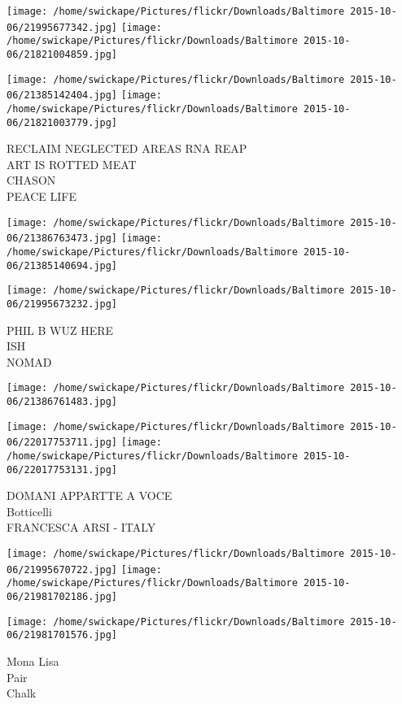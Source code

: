 \documentclass[10pt,letterpaper]{article}
\begin{document}
\texttt{[image: /home/swickape/Pictures/flickr/Downloads/Baltimore 2015-10-06/21995677342.jpg]}
\texttt{[image: /home/swickape/Pictures/flickr/Downloads/Baltimore 2015-10-06/21821004859.jpg]}

\texttt{[image: /home/swickape/Pictures/flickr/Downloads/Baltimore 2015-10-06/21385142404.jpg]}
\texttt{[image: /home/swickape/Pictures/flickr/Downloads/Baltimore 2015-10-06/21821003779.jpg]}

RECLAIM NEGLECTED AREAS RNA REAP\\
ART IS ROTTED MEAT\\
CHASON\\
PEACE LIFE\\
\pagebreak

\texttt{[image: /home/swickape/Pictures/flickr/Downloads/Baltimore 2015-10-06/21386763473.jpg]}
\texttt{[image: /home/swickape/Pictures/flickr/Downloads/Baltimore 2015-10-06/21385140694.jpg]}

\texttt{[image: /home/swickape/Pictures/flickr/Downloads/Baltimore 2015-10-06/21995673232.jpg]}

PHIL B WUZ HERE\\
ISH\\
NOMAD\\
\pagebreak

\texttt{[image: /home/swickape/Pictures/flickr/Downloads/Baltimore 2015-10-06/21386761483.jpg]}

\vspace{0.25in}
\texttt{[image: /home/swickape/Pictures/flickr/Downloads/Baltimore 2015-10-06/22017753711.jpg]}
\texttt{[image: /home/swickape/Pictures/flickr/Downloads/Baltimore 2015-10-06/22017753131.jpg]}

DOMANI APPARTTE A VOCE\\
Botticelli\\
FRANCESCA ARSI {-} ITALY\\
\pagebreak

\texttt{[image: /home/swickape/Pictures/flickr/Downloads/Baltimore 2015-10-06/21995670722.jpg]}
\texttt{[image: /home/swickape/Pictures/flickr/Downloads/Baltimore 2015-10-06/21981702186.jpg]}

\texttt{[image: /home/swickape/Pictures/flickr/Downloads/Baltimore 2015-10-06/21981701576.jpg]}

Mona Lisa\\
Pair\\
Chalk\\
\pagebreak
\end{document}
